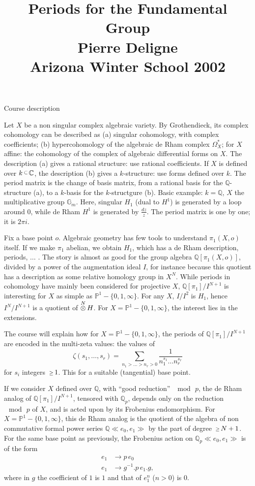 \documentclass[12pt,leqno]{article}
\title{\titlefont Periods for the Fundamental Group\\
Pierre Deligne\\
Arizona Winter School 2002}
\author{}
\date{}
\newcommand{\dbC}{{\mathbb{C}}} %
\newcommand{\dbG}{{\mathbb{G}}}
\newcommand{\dbP}{{\mathbb{P}}}
\newcommand{\dbQ}{{\mathbb{Q}}}
\newcommand{\Ge}{{{\mathchoice{\,{\scriptstyle\ge}\,}
  {\,{\scriptstyle\ge}\,}
  {\,{\scriptscriptstyle\ge}\,}{\,{\scriptscriptstyle\ge}\,}}}}
\newcommand{\dspace}{\lineskip=2pt
     \baselineskip=18pt\lineskiplimit=0pt}
\newcommand{\SubSet}{\raise2pt\hbox{$\,\scriptstyle
     \subset\,$}}
\newcommand{\otimesop}{\operatornamewithlimits{\otimes}\limits}
\begin{document}
\maketitle


\bigskip
\dspace
\noindent
{\sectionfont Course description}

Let $X$ be a non singular complex algebraic
variety.
By Grothendieck, its complex
cohomology can be described as (a) singular
cohomology, with complex coefficients;
(b) hypercohomology of the algebraic de Rham
complex $\Omega_X^*$; for $X$ affine: the
cohomology of the complex of algebraic
differential forms on $X$.
The description (a) gives a rational
structure: use rational coefficients.
If $X$ is defined over $k\SubSet\dbC$,
the description (b) gives a $k$-structure: use
forms defined over $k$.
The period matrix is the change of basis
matrix, from a rational basis for the
$\dbQ$-structure (a), to a $k$-basis for the
$k$-structgure (b).
Basic example: $k=\dbQ$, $X$ the
multiplicative group $\dbG_m$.
Here, singular $H_1$ (dual to $H^1$) is
generated by a loop around $0$, while de Rham
$H^1$ is generated by $\frac{dz}{z}$.
The period matrix is one by one; it is $2\pi i$.

Fix a base point $o$.
Algebraic geometry has few tools to understand
$\pi_1(X,o)$ itself.
If we make $\pi_1$ abelian, we obtain $H_1$,
which has a de Rham description, periods,
$\ldots\,\,$.
The story is almost as good for the group
algebra $\dbQ[\pi_1(X,o)]$, divided by a power
of the augmentation ideal $I$, for instance
because this quotient has a description as
some relative homology group in $X^N$.
While periods in cohomology have mainly been
considered for projective $X$,
$\dbQ[\pi_1]/I^{N+1}$ is interesting for $X$
as simple as $\dbP^1-\{0,1,\infty\}$.
For any $X$, $I/I^2$ is $H_1$, hence
$I^N/I^{N+1}$ is a quotient of $\otimesop^{N}H$.
For $X=\dbP^1-\{0,1,\infty\}$, the interest
lies in the extensions.

The course will explain how for
$X=\dbP^1-\{0,1,\infty\}$, the periods of
$\dbQ[\pi_1]/I^{N+1}$ are encoded in the
multi-zeta values: the values of
$$
\zeta (s_1,\dotsc,s_r)=
\sum\limits_{n_1>\ldots>n_r>0}
\frac{1}{n_1^{s_1}\ldots n_r^{s_r}}
$$
for $s_i$ integers $\Ge 1$.
This for a suitable (tangential) base point.

If we consider $X$ defined over $\dbQ$, with
``good reduction'' $\mod\,p$, the de Rham
analog of $\dbQ[\pi_1]/I^{N+1}$, tensored with
$\dbQ_p$, depends only on the reduction
$\mod\,p$ of $X$, and is acted upon by its
Frobenius endomorphism.
For $X=\dbP^1-\{0,1,\infty\}$, this de Rham
analog is the quotient of the algebra of non
commutative formal power series $\dbQ\ll
e_0,e_1\gg$ by the part of degree $\Ge N+1$.
For the same base point as previously, the
Frobenius action on $\dbQ_p\ll e_0,e_1\gg$
is of the form
\begin{align*}
e_1 &\to p\,e_0\\
e_1 &\to g^{-1}.p\,e_1.g,
\end{align*}
where in $g$ the coefficient of $1$ is $1$ and
that of $e_1^n$ ($n>0$) is $0$.
\end{document}
